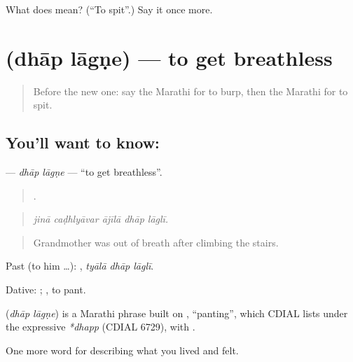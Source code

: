 \begin{tcolorbox}[breakable,colback=teal!4,colframe=teal!35!black,title={Before you move on}]
What does  mean? (\textquotedblleft{}To spit\textquotedblright{}.) Say it once more.
\end{tcolorbox}
\section[\texorpdfstring{\mr{धाप} \mr{लागणे} (dhāp lāgṇe)}{धाप लागणे (dhāp lāgṇe)}]{  (dhāp lāgṇe) — to get breathless}

\label{lesson:MR-C492-dhap-lagne}



\begin{quote}
Before the new one: say the Marathi for to burp, then the Marathi for to spit.
\end{quote}

\subsection*{You'll want to know:  }
\textbf{ } — \emph{dhāp lāgṇe} — \textquotedblleft{}to get breathless\textquotedblright{}.

\begin{quote}
    .
\end{quote}

\begin{quote}
\emph{jinā caḍhlyāvar ājīlā dhāp lāglī.}
\end{quote}

\begin{quote}
Grandmother was out of breath after climbing the stairs.
\end{quote}

Past (to him …):   , \emph{tyālā dhāp lāglī}.

Dative:   ;  , to pant.

\begin{cousinweb}
\textbf{ } (\emph{dhāp lāgṇe}) is a Marathi phrase built on , \textquotedblleft{}panting\textquotedblright{}, which CDIAL lists under the expressive \emph{*dhapp} (CDIAL 6729), with .
\end{cousinweb}

\begin{grammarlens}[title={What you've built}]
One more word for describing what you lived and felt.
\end{grammarlens}

